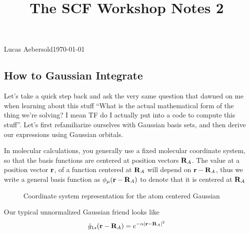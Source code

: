 \documentclass[11pt]{article}
\begin{document}
\title{The SCF Workshop Notes 2}{Lucas Aebersold}{\today}
\setcounter{section}{2}
\subsection{How to Gaussian Integrate}
Let's take a quick step back and ask the very same question that dawned on me when learning about this stuff ``What is the actual mathematical form of the thing we're solving? I mean TF do I actually put into a code to compute this stuff''. Let's first refamiliarize ourselves with Gaussian basis sets, and then derive our expressions using Gaussian orbitals. 

In molecular calculations, you generally use a fixed molecular coordinate system, so that the basis functions are centered at position vectors $\textbf{R}_A$. The value at a position vector $\textbf{r}$, of a function centered at $\textbf{R}_A$ will depend on $\textbf{r} - \textbf{R}_A$, thus we write a general basis function as $\phi_\mu (\textbf{r} - \textbf{R}_A)$ to denote that it is centered at $\textbf{R}_A$
\begin{figure}[H]
	\centering
{}
\caption{Coordinate system representation for the atom centered Gaussian}
\end{figure}
Our typical unnormalized Gaussian friend looks like
\begin{equation}\label{key}
\tilde{g}_{1s} (\textbf{r} - \textbf{R}_A) = e^{-\alpha | \textbf{r} - \textbf{R}_A|^2} 
\end{equation}
\end{document}
